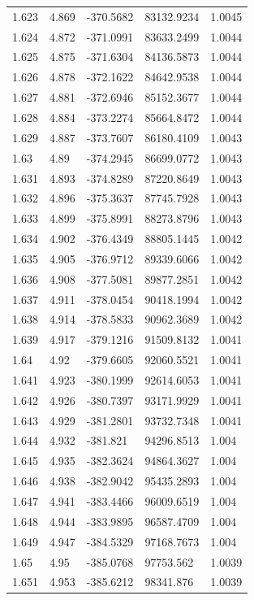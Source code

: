 \begin{tabular}{lllll}
1.623 & 4.869 & -370.5682 & 83132.9234 & 1.0045 \\
1.624 & 4.872 & -371.0991 & 83633.2499 & 1.0044 \\
1.625 & 4.875 & -371.6304 & 84136.5873 & 1.0044 \\
1.626 & 4.878 & -372.1622 & 84642.9538 & 1.0044 \\
1.627 & 4.881 & -372.6946 & 85152.3677 & 1.0044 \\
1.628 & 4.884 & -373.2274 & 85664.8472 & 1.0044 \\
1.629 & 4.887 & -373.7607 & 86180.4109 & 1.0043 \\
1.63 & 4.89 & -374.2945 & 86699.0772 & 1.0043 \\
1.631 & 4.893 & -374.8289 & 87220.8649 & 1.0043 \\
1.632 & 4.896 & -375.3637 & 87745.7928 & 1.0043 \\
1.633 & 4.899 & -375.8991 & 88273.8796 & 1.0043 \\
1.634 & 4.902 & -376.4349 & 88805.1445 & 1.0042 \\
1.635 & 4.905 & -376.9712 & 89339.6066 & 1.0042 \\
1.636 & 4.908 & -377.5081 & 89877.2851 & 1.0042 \\
1.637 & 4.911 & -378.0454 & 90418.1994 & 1.0042 \\
1.638 & 4.914 & -378.5833 & 90962.3689 & 1.0042 \\
1.639 & 4.917 & -379.1216 & 91509.8132 & 1.0041 \\
1.64 & 4.92 & -379.6605 & 92060.5521 & 1.0041 \\
1.641 & 4.923 & -380.1999 & 92614.6053 & 1.0041 \\
1.642 & 4.926 & -380.7397 & 93171.9929 & 1.0041 \\
1.643 & 4.929 & -381.2801 & 93732.7348 & 1.0041 \\
1.644 & 4.932 & -381.821 & 94296.8513 & 1.004 \\
1.645 & 4.935 & -382.3624 & 94864.3627 & 1.004 \\
1.646 & 4.938 & -382.9042 & 95435.2893 & 1.004 \\
1.647 & 4.941 & -383.4466 & 96009.6519 & 1.004 \\
1.648 & 4.944 & -383.9895 & 96587.4709 & 1.004 \\
1.649 & 4.947 & -384.5329 & 97168.7673 & 1.004 \\
1.65 & 4.95 & -385.0768 & 97753.562 & 1.0039 \\
1.651 & 4.953 & -385.6212 & 98341.876 & 1.0039 \\

\end{tabular}
